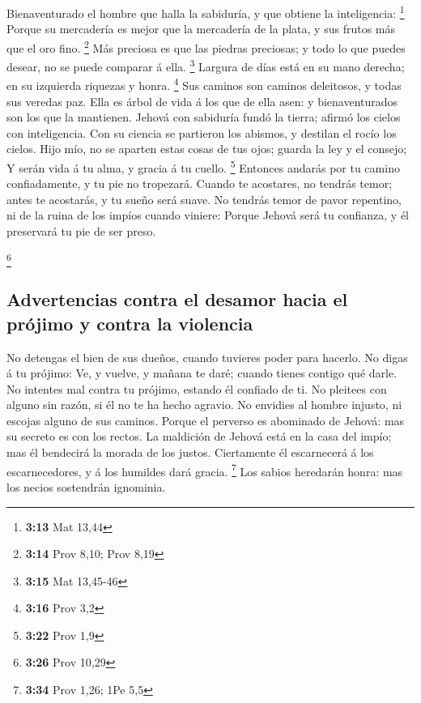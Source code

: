  Bienaventurado el hombre que halla la sabiduría, y que
obtiene la inteligencia: \footnote{\textbf{3:13} Mat 13,44}
 Porque su mercadería es mejor que la mercadería de la
plata, y sus frutos más que el oro fino. \footnote{\textbf{3:14} Prov
  8,10; Prov 8,19}  Más preciosa es que las piedras
preciosas; y todo lo que puedes desear, no se puede comparar á ella.
\footnote{\textbf{3:15} Mat 13,45-46}  Largura de días está
en su mano derecha; en su izquierda riquezas y honra. \footnote{\textbf{3:16}
  Prov 3,2}  Sus caminos son caminos deleitosos, y todas
sus veredas paz.  Ella es árbol de vida á los que de ella
asen: y bienaventurados son los que la mantienen.  Jehová
con sabiduría fundó la tierra; afirmó los cielos con inteligencia.
 Con su ciencia se partieron los abismos, y destilan el
rocío los cielos.  Hijo mío, no se aparten estas cosas de
tus ojos; guarda la ley y el consejo;  Y serán vida á tu
alma, y gracia á tu cuello. \footnote{\textbf{3:22} Prov 1,9}
 Entonces andarás por tu camino confiadamente, y tu pie no
tropezará.  Cuando te acostares, no tendrás temor; antes te
acostarás, y tu sueño será suave.  No tendrás temor de
pavor repentino, ni de la ruina de los impíos cuando viniere:
 Porque Jehová será tu confianza, y él preservará tu pie de
ser preso.

\footnote{\textbf{3:26} Prov 10,29}

\hypertarget{advertencias-contra-el-desamor-hacia-el-pruxf3jimo-y-contra-la-violencia}{%
\subsection{Advertencias contra el desamor hacia el prójimo y contra la
violencia}\label{advertencias-contra-el-desamor-hacia-el-pruxf3jimo-y-contra-la-violencia}}

 No detengas el bien de sus dueños, cuando tuvieres poder
para hacerlo.  No digas á tu prójimo: Ve, y vuelve, y
mañana te daré; cuando tienes contigo qué darle.  No
intentes mal contra tu prójimo, estando él confiado de ti. 
No pleitees con alguno sin razón, si él no te ha hecho agravio.
 No envidies al hombre injusto, ni escojas alguno de sus
caminos.  Porque el perverso es abominado de Jehová: mas su
secreto es con los rectos.  La maldición de Jehová está en
la casa del impío; mas él bendecirá la morada de los justos.
 Ciertamente él escarnecerá á los escarnecedores, y á los
humildes dará gracia. \footnote{\textbf{3:34} Prov 1,26; 1Pe 5,5}
 Los sabios heredarán honra: mas los necios sostendrán
ignominia.

